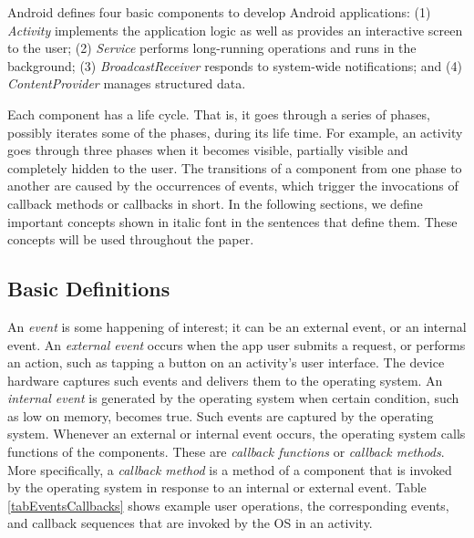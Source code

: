 \documentclass[10pt]{elsarticle}
\begin{document}
Android defines four basic components to develop Android applications: (1) \emph{Activity} implements the application logic as well as provides an interactive screen to the user; (2) \emph{Service} performs long-running operations and runs in the background; (3) \emph{BroadcastReceiver} responds to system-wide notifications; and (4) \emph{ContentProvider} manages structured data. 

Each component has a life cycle. That is, it goes through a series of phases, possibly iterates some of the phases, during its life time. For example, an activity goes through three phases when it becomes visible, partially visible and completely hidden to the user. The transitions of a component from one phase to another are caused by the occurrences of events, which trigger the invocations of callback methods or callbacks in short. In the following sections, we define important concepts shown in italic font in the sentences that define them. These concepts will be used throughout the paper.


\subsection{Basic Definitions}

An \emph{event} is some happening of interest; it can be an external event, or an internal event. An \emph{external event} occurs when the app user submits a request, or performs an action, such as tapping a button on an activity's user interface. The device hardware captures such events and delivers them to the operating system. An \emph{internal event} is generated by the operating system when certain condition, such as low on memory, becomes true. Such events are captured by the operating system. Whenever an external or internal event occurs, the operating system calls functions of the components. These are \emph{callback functions} or \emph{callback methods}. More specifically, a \emph{callback method} is a method of a component that is invoked by the operating system in response to an internal or external event. Table \ref{tabEventsCallbacks} shows example user operations, the corresponding events, and callback sequences that are invoked by the OS in an activity.
\end{document}
